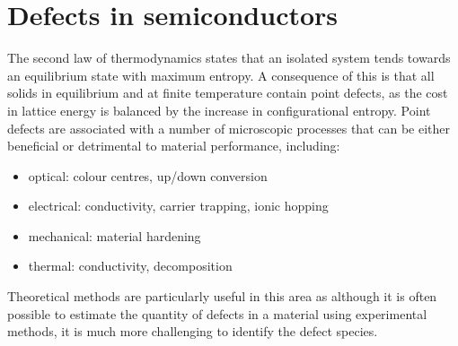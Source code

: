 

\section{Defects in semiconductors}

The second law of thermodynamics states that an isolated system tends towards an equilibrium state with maximum entropy. A consequence of this is that all solids in equilibrium and at finite temperature contain point defects, as the cost in lattice energy is balanced by the increase in configurational entropy. 
Point defects are associated with a number of microscopic processes that can be either beneficial or detrimental to material performance, including:
\begin{itemize}[noitemsep]
    \item optical: colour centres, up/down conversion
    \item electrical: conductivity, carrier trapping, ionic hopping
    \item mechanical: material hardening
    \item thermal: conductivity, decomposition
\end{itemize}
Theoretical methods are particularly useful in this area as although it is often possible to estimate the quantity of defects in a material using experimental methods, it is much more challenging to identify the defect species.\autocite{Alkauskas2016}  
 
